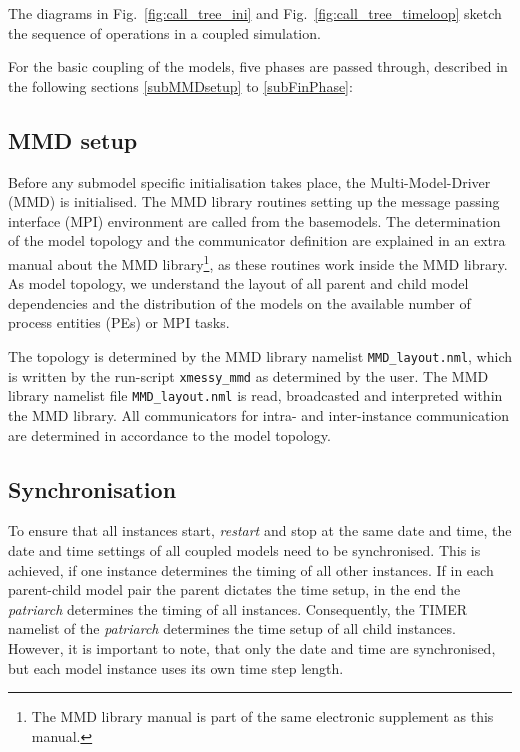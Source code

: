 \documentclass[11pt,twoside]{article}
\begin{document}
The diagrams in Fig.\ \ref{fig:call_tree_ini}  and Fig.\ \ref{fig:call_tree_timeloop}  sketch the sequence of operations in a coupled simulation.

For the basic coupling of the models, five phases are passed through,
described in the following sections \ref{subMMDsetup} to \ref{subFinPhase}:

\subsection {\bf MMD setup \label{subMMDsetup}} 
Before any submodel specific initialisation takes place, 
the Multi-Model-Driver (MMD) is initialised. 
The MMD library routines setting up the message passing interface
 (MPI) environment are called from the basemodels.
The determination of the model topology and the communicator definition are 
 explained in an extra manual about the MMD library\footnote{The MMD library 
manual is part of the same electronic supplement as this manual.}, 
as these routines work inside the MMD library.
 As model topology, we understand the layout of all parent and child model 
dependencies and the distribution of the models on the available number of 
process entities (PEs) or MPI tasks.

 The topology is determined by the MMD library namelist \verb|MMD_layout.nml|, 
which is written by the run-script \verb|xmessy_mmd| as determined by the user.
The MMD library namelist file \verb|MMD_layout.nml| is read, broadcasted and 
interpreted within the MMD library. All communicators for intra- and
inter-instance 
 communication are determined in accordance to the model topology. 

\subsection{Synchronisation}
To ensure that all instances start, {\it restart} and stop at the 
same date and 
time, the date and time settings of all coupled models need to be synchronised.
This is achieved, if one instance determines the timing of all other instances. 
If in each parent-child model pair the parent dictates the time setup,
 in the end the {\it patriarch} determines the timing of all instances.
Consequently, the TIMER namelist of the {\it patriarch} determines the 
time setup of all child instances. However, it is important to note,
that only the date and time are synchronised, but each model instance uses its
own time step length. 
\end{document}
